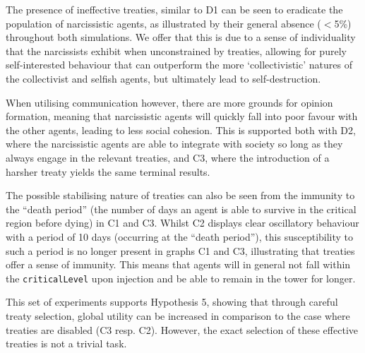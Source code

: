 The presence of ineffective treaties, similar to D1 can be seen to eradicate the population of narcissistic agents, as illustrated by their general absence ($<$5\%) throughout both simulations. We offer that this is due to a sense of individuality that the narcissists exhibit when unconstrained by treaties, allowing for purely self-interested behaviour that can outperform the more `collectivistic' natures of the collectivist and selfish agents, but ultimately lead to self-destruction.

When utilising communication however, there are more grounds for opinion formation, meaning that narcissistic agents will quickly fall into poor favour with the other agents, leading to less social cohesion. This is supported both with D2, where the narcissistic agents are able to integrate with society so long as they always engage in the relevant treaties, and C3, where the introduction of a harsher treaty yields the same terminal results.

The possible stabilising nature of treaties can also be seen from the immunity to the ``death period'' (the number of days an agent is able to survive in the critical region before dying) in C1 and C3. Whilst C2 displays clear oscillatory behaviour with a period of 10 days (occurring at the ``death period''), this susceptibility to such a period is no longer present in graphs C1 and C3, illustrating that treaties offer a sense of immunity. This means that agents will in general not fall within the \texttt{criticalLevel} upon injection and be able to remain in the tower for longer.

This set of experiments supports Hypothesis 5, showing that through careful treaty selection, global utility can be increased in comparison to the case where treaties are disabled (C3 resp. C2). However, the exact selection of these effective treaties is not a trivial task.


